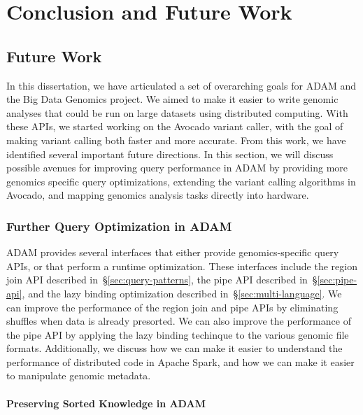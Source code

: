 \documentclass[phd]{ucbthesis}
\begin{document}
\part{Conclusion and Future Work}

\chapter{Future Work}
\label{chap:future-work}

In this dissertation, we have articulated a set of overarching goals for
{ADAM} and the {Big Data Genomics} project. We aimed to make it
easier to write genomic analyses that could be run on large datasets using
distributed computing. With these APIs, we started working on the
{Avocado} variant caller, with the goal of making variant calling both
faster and more accurate. From this work, we have identified several important
future directions. In this section, we will discuss possible avenues for
improving query performance in {ADAM} by providing more genomics specific
query optimizations, extending the variant calling algorithms in
{Avocado}, and mapping genomics analysis tasks directly into hardware.

\section{Further Query Optimization in {ADAM}}
\label{sec:extensions-adam}

{ADAM} provides several interfaces that either provide genomics-specific
query APIs, or that perform a runtime optimization. These interfaces include the
region join API described in~\S\ref{sec:query-patterns}, the {pipe} API
described in~\S\ref{sec:pipe-api}, and the lazy binding optimization described
in~\S\ref{sec:multi-language}. We can improve the performance of the region join
and {pipe} APIs by eliminating shuffles when data is already presorted.
We can also improve the performance of the {pipe} API by applying the
lazy binding techinque to the various genomic file formats. Additionally, we
discuss how we can make it easier to understand the performance of distributed
code in {Apache Spark}, and how we can make it easier to manipulate
genomic metadata.

\subsection{Preserving Sorted Knowledge in {ADAM}}
\label{sec:sorted-knowledge}
\end{document}
